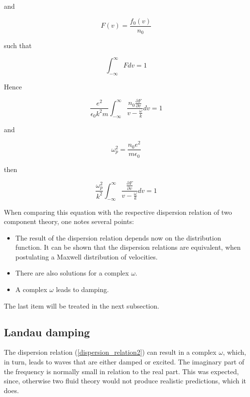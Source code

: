 \documentclass[a4paper,10pt]{report}
\begin{document}
and

\begin{equation}
    F(v)=\frac{f_0(v)}{n_0}
\end{equation}

such that

\begin{equation}
     \int^{\infty}_{-\infty }{F dv}=1
\end{equation}

Hence

\begin{equation}\label{dispersion_relation1}
 \frac{e^2}{\epsilon_0 k^2 m}  \int^{\infty}_{-\infty }{  \frac{n_0\frac{\partial F}{\partial v}}{v-\frac{\omega}{k}} dv} =1
\end{equation}

and

\begin{equation}
    \omega_p^2=\frac{n_0 e^2 }{m \epsilon_0}
\end{equation}

then

\begin{equation}\label{dispersion_relation2}
 \frac{ \omega_p^2}{ k^2}  \int^{\infty}_{-\infty }{  \frac{\frac{\partial F}{\partial v}}{v-\frac{\omega}{k}} dv} =1
\end{equation}

When comparing this equation with the respective dispersion relation of two component theory, one notes several points:

\begin{itemize}
    \item The result of the dispersion relation depends now on the distribution function. It can be shown that the dispersion relations are equivalent, when postulating a Maxwell distribution of velocities.
\item There are also solutions for a complex $\omega$.
\item A complex $\omega$ leads to damping.
\end{itemize}

The last item will be treated in the next subsection.

\subsection{Landau damping}

The dispersion relation (\ref{dispersion_relation2}) can result in a complex $\omega$, which, in turn, leads to waves that are either damped or excited. The imaginary part of the frequency is normally small in relation to the real part. This was expected, since, otherwise two fluid theory would not produce realistic predictions, which it does.\\
\end{document}
